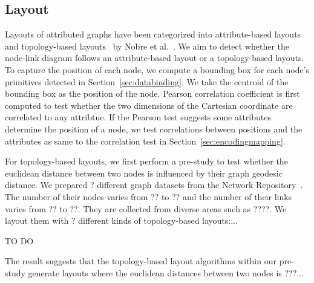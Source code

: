 \subsection{Layout}
Layouts of attributed graphs have been categorized into attribute-based layouts~\cite{} and topology-based layouts~\cite{} by Nobre et al.~\cite{DBLP:journals/cgf/NobreMSL19}.
We aim to detect whether the node-link diagram follows an attribute-based layout or a topology-based layouts.
To capture the position of each node, we compute a bounding box for each node's primitives detected in Section~\ref{sec:databinding}.
We take the centroid of the bounding box as the position of the node.
Pearson correlation coefficient is first computed to test whether the two dimensions of the Cartesian coordinate are correlated to any attribtue.
If the Pearson test suggests some attributes determine the position of a node,
we test correlations between positions and the attributes as same to the correlation test in Section~\ref{sec:encodingmapping}.

For topology-based layouts, we first perform a pre-study to test whether the euclidean distance between two nodes is influenced by their graph geodesic distance.
We prepared ? different graph datasets from the Network Repository~\cite{}.
The number of their nodes varies from ?? to ?? and the number of their links varies from ?? to ??.
They are collected from diverse areas such as ????.
We layout them with ? different kinds of topology-based layouts:...

{\color{text-highlight}TO DO}

The result suggests that the topology-based layout algorithms within our pre-study generate layouts where the euclidean distances between two nodes is ???...